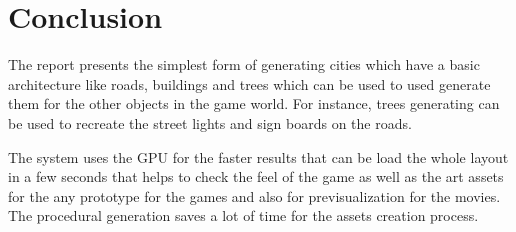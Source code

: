 \chapter{Conclusion}
\large The report presents the simplest form of generating cities which have a basic architecture like roads, buildings and trees which can be used to used generate them for the other objects in the game world. For instance, trees generating can be used to recreate the street lights and sign boards on the roads.

\vspace{0.5cm}

\large The system uses the GPU for the faster results that can be load the whole layout in a few seconds that helps to check the feel of the game as well as the art assets for the any prototype for the games and also for previsualization for the movies. The procedural generation saves a lot of time for the assets creation process.